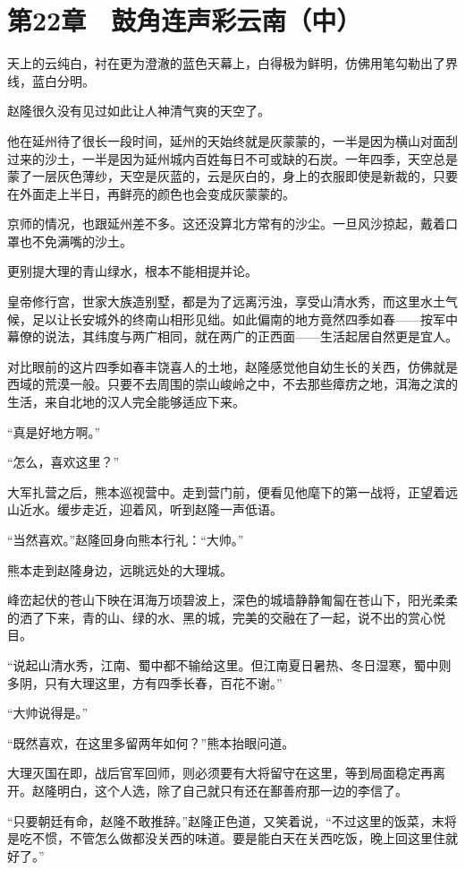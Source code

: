 \section{第22章　鼓角连声彩云南（中）}

天上的云纯白，衬在更为澄澈的蓝色天幕上，白得极为鲜明，仿佛用笔勾勒出了界线，蓝白分明。

赵隆很久没有见过如此让人神清气爽的天空了。

他在延州待了很长一段时间，延州的天始终就是灰蒙蒙的，一半是因为横山对面刮过来的沙土，一半是因为延州城内百姓每日不可或缺的石炭。一年四季，天空总是蒙了一层灰色薄纱，天空是灰蓝的，云是灰白的，身上的衣服即使是新裁的，只要在外面走上半日，再鲜亮的颜色也会变成灰蒙蒙的。

京师的情况，也跟延州差不多。这还没算北方常有的沙尘。一旦风沙掠起，戴着口罩也不免满嘴的沙土。

更别提大理的青山绿水，根本不能相提并论。

皇帝修行宫，世家大族造别墅，都是为了远离污浊，享受山清水秀，而这里水土气候，足以让长安城外的终南山相形见绌。如此偏南的地方竟然四季如春——按军中幕僚的说法，其纬度与两广相同，就在两广的正西面——生活起居自然更是宜人。

对比眼前的这片四季如春丰饶喜人的土地，赵隆感觉他自幼生长的关西，仿佛就是西域的荒漠一般。只要不去周围的崇山峻岭之中，不去那些瘴疠之地，洱海之滨的生活，来自北地的汉人完全能够适应下来。

“真是好地方啊。”

“怎么，喜欢这里？”

大军扎营之后，熊本巡视营中。走到营门前，便看见他麾下的第一战将，正望着远山近水。缓步走近，迎着风，听到赵隆一声低语。

“当然喜欢。”赵隆回身向熊本行礼：“大帅。”

熊本走到赵隆身边，远眺远处的大理城。

峰峦起伏的苍山下映在洱海万顷碧波上，深色的城墙静静匍匐在苍山下，阳光柔柔的洒了下来，青的山、绿的水、黑的城，完美的交融在了一起，说不出的赏心悦目。

“说起山清水秀，江南、蜀中都不输给这里。但江南夏日暑热、冬日湿寒，蜀中则多阴，只有大理这里，方有四季长春，百花不谢。”

“大帅说得是。”

“既然喜欢，在这里多留两年如何？”熊本抬眼问道。

大理灭国在即，战后官军回师，则必须要有大将留守在这里，等到局面稳定再离开。赵隆明白，这个人选，除了自己就只有还在鄯善府那一边的李信了。

“只要朝廷有命，赵隆不敢推辞。”赵隆正色道，又笑着说，“不过这里的饭菜，末将是吃不惯，不管怎么做都没关西的味道。要是能白天在关西吃饭，晚上回这里住就好了。”

